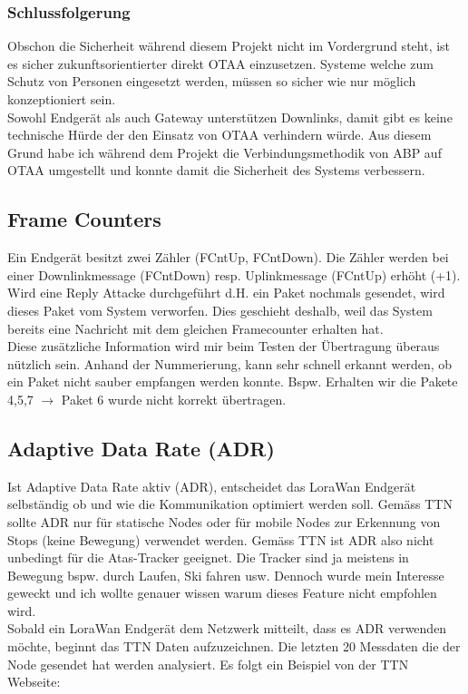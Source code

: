 \documentclass[11pt,english,german]{report}
\theoremstyle{definition}
\begin{document}
\newpage
\subsubsection{Schlussfolgerung}
Obschon die Sicherheit während diesem Projekt nicht im Vordergrund steht, ist es sicher zukunftsorientierter direkt OTAA einzusetzen. Systeme welche zum Schutz von Personen eingesetzt werden, müssen so sicher wie nur möglich konzeptioniert sein.\\[0.3cm]
Sowohl Endgerät als auch Gateway unterstützen Downlinks, damit gibt es keine technische Hürde der den Einsatz von OTAA verhindern würde. Aus diesem Grund habe ich während dem Projekt die Verbindungsmethodik von ABP auf OTAA umgestellt und konnte damit die Sicherheit des Systems verbessern.

\subsection{Frame Counters}
Ein Endgerät besitzt zwei Zähler (FCntUp, FCntDown). Die Zähler werden bei einer Downlinkmessage (FCntDown) resp. Uplinkmessage (FCntUp) erhöht (+1).\\[0.3cm]
Wird eine Reply Attacke durchgeführt d.H. ein Paket nochmals gesendet, wird dieses Paket vom System verworfen. Dies geschieht deshalb, weil das System bereits eine Nachricht mit dem gleichen Framecounter erhalten hat.\\[0.3cm]
Diese zusätzliche Information wird mir beim Testen der Übertragung überaus nützlich sein. Anhand der Nummerierung, kann sehr schnell erkannt werden, ob ein Paket nicht sauber empfangen werden konnte. Bspw. Erhalten wir die Pakete 4,5,7 $\rightarrow$ Paket 6 wurde nicht korrekt übertragen.

\subsection{Adaptive Data Rate (ADR)}
Ist Adaptive Data Rate aktiv (ADR), entscheidet das LoraWan Endgerät selbständig ob und wie die Kommunikation optimiert werden soll. Gemäss TTN \cite{ADRTTN} sollte ADR nur für statische Nodes oder für mobile Nodes zur Erkennung von Stops (keine Bewegung) verwendet werden. Gemäss TTN ist ADR also nicht unbedingt für die Atas-Tracker geeignet. Die Tracker sind ja meistens in Bewegung bspw. durch Laufen, Ski fahren usw. Dennoch wurde mein Interesse geweckt und ich wollte genauer wissen warum dieses Feature nicht empfohlen wird.\\[0.3cm]
Sobald ein LoraWan Endgerät dem Netzwerk mitteilt, dass es ADR verwenden möchte, beginnt das TTN Daten aufzuzeichnen. Die letzten 20 Messdaten die der Node gesendet hat werden analysiert. Es folgt ein Beispiel von der TTN Webseite:
\end{document}
